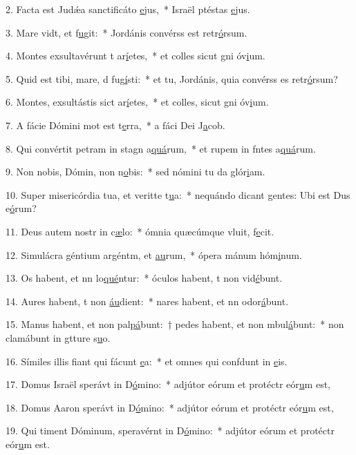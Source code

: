 2. Facta est Judǽa sanctificáto \uline{e}jus,~* Israël ptéstas \uline{e}jus.\par 
3. Mare vidt, et f\uline{u}git:~* Jordánis convérss est retr\uline{ó}rsum.\par 
4. Montes exsultavérunt t ar\uline{í}etes,~* et colles sicut gni óv\uline{i}um.\par 
5. Quid est tibi, mare, d fug\uline{í}sti:~* et tu, Jordánis, quia convérss es retr\uline{ó}rsum?\par 
6. Montes, exsultástis sict ar\uline{í}etes,~* et colles, sicut gni óv\uline{i}um.\par 
7. A fácie Dómini mot est t\uline{e}rra,~* a fáci Dei J\uline{a}cob.\par 
8. Qui convértit petram in stagn a\uline{quá}rum,~* et rupem in fntes a\uline{quá}rum.\par 
9. Non nobis, Dómin, non n\uline{o}bis:~* sed nómini tu da glór\uline{i}am.\par 
10. Super misericórdia tua, et veritte t\uline{u}a:~* nequándo dicant gentes: Ubi est Dus e\uline{ó}rum?\par 
11. Deus autem nostr in c\uline{æ}lo:~* ómnia quæcúmque vluit, f\uline{e}cit.\par 
12. Simulácra géntium argéntm, et \uline{au}rum,~* ópera mánum hóm\uline{i}num.\par 
13. Os habent, et nn lo\uline{qué}ntur:~* óculos habent, t non vid\uline{é}bunt.\par 
14. Aures habent, t non \uline{áu}dient:~* nares habent, et nn odor\uline{á}bunt.\par 
15. Manus habent, et non pal\uline{pá}bunt:~† pedes habent, et non mbul\uline{á}bunt:~* non clamábunt in gtture s\uline{u}o.\par 
16. Símiles illis fiant qui fácunt \uline{e}a:~* et omnes qui confdunt in \uline{e}is.\par 
17. Domus Israël sperávt in D\uline{ó}mino:~* adjútor eórum et protéctr eór\uline{u}m est,\par 
18. Domus Aaron sperávt in D\uline{ó}mino:~* adjútor eórum et protéctr eór\uline{u}m est,\par 
19. Qui timent Dóminum, speravérnt in D\uline{ó}mino:~* adjútor eórum et protéctr eór\uline{u}m est.\par 
